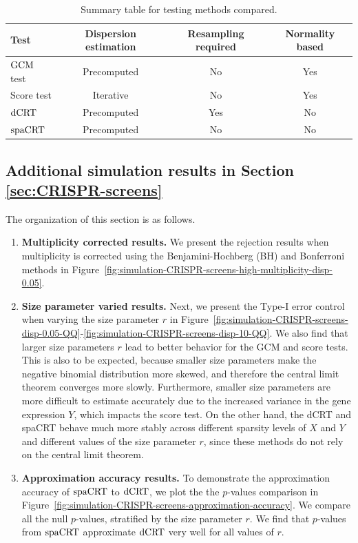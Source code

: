 \documentclass[12pt]{article}
\theoremstyle{definition}
\newcommand{\dCRT}{\textnormal{dCRT}} 					%
\newcommand{\GCM}{\textnormal{GCM}}						%
\newcommand{\spacrt}{\textnormal{spaCRT}}               %
\begin{document}
  \begin{table}[!h]
    \centering
    \begin{tabular}{l|c|c|c}
    Test & Dispersion estimation & Resampling required & Normality based \\
    \hline
    $\GCM$ test & Precomputed & No & Yes \\
    Score test & Iterative & No & Yes \\
    $\dCRT$ & Precomputed & Yes & No \\
    $\spacrt$ & Precomputed & No & No
    \end{tabular}
  \caption{Summary table for testing methods compared.}
  \label{tab:methodology_summary}
  \end{table}


\subsection{Additional simulation results in Section \ref{sec:CRISPR-screens}}\label{sec:additional_simulation_results_CRISPR}
  
The organization of this section is as follows. 

\begin{enumerate}
	\item \textbf{Multiplicity corrected results.} We present the rejection results when multiplicity is corrected using the Benjamini-Hochberg (BH) and Bonferroni methods in Figure~\ref{fig:simulation-CRISPR-screens-high-multiplicity-disp-0.05}. 
	\item \textbf{Size parameter varied results.} Next, we present the Type-I error control when varying the size parameter $r$ in Figure~\ref{fig:simulation-CRISPR-screens-disp-0.05-QQ}-\ref{fig:simulation-CRISPR-screens-disp-10-QQ}. We also find that larger size parameters $r$ lead to better behavior for the GCM and score tests. This is also to be expected, because smaller size parameters make the negative binomial distribution more skewed, and therefore the central limit theorem converges more slowly. Furthermore, smaller size parameters are more difficult to estimate accurately due to the increased variance in the gene expression $Y$, which impacts the score test. On the other hand, the dCRT and spaCRT behave much more stably across different sparsity levels of $X$ and $Y$ and different values of the size parameter $r$, since these methods do not rely on the central limit theorem.
	\item \textbf{Approximation accuracy results.} To demonstrate the approximation accuracy of $\spacrt$ to $\dCRT$, we plot the the $p$-values comparison in Figure~\ref{fig:simulation-CRISPR-screens-approximation-accuracy}. We compare all the null $p$-values, stratified by the size parameter $r$. We find that $p$-values from $\spacrt$ approximate $\dCRT$ very well for all values of $r$.
\end{enumerate}
\end{document}
